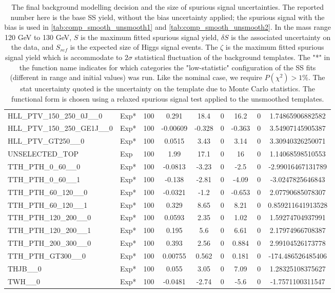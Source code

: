 \begin{table}[!h]
{\begin{tabular}{llccccccS[table-format = 3.2, round-mode = places, round-precision = 2]}
 HLL\_PTV\_150\_250\_0J\_\_0 & Exp* &100&0.291&18.4&0&16.2&0&1.74865906882582\\
 HLL\_PTV\_150\_250\_GE1J\_\_0 & Exp* &100&-0.00609&-0.328&0&-0.363&0&3.54907145905387\\
 HLL\_PTV\_GT250\_\_0 & Exp* &100&0.0515&3.43&0&3.14&0&3.30940326250071\\
 UNSELECTED\_TOP & Exp &100&1.99&17.1&0&16&0&1.14068598510553\\
 TTH\_PTH\_0\_60\_\_0 & Exp* &100&-0.0813&-3.23&0&-2.5&0&-2.99016467131789\\
 TTH\_PTH\_0\_60\_\_1 & Exp* &100&-0.138&-2.81&0&-4.09&0&-3.0247825646843\\
 TTH\_PTH\_60\_120\_\_0 & Exp* &100&-0.0321&-1.2&0&-0.653&0&2.07790685078307\\
 TTH\_PTH\_60\_120\_\_1 & Exp* &100&0.329&8.65&0&8.21&0&0.859211641913528\\
 TTH\_PTH\_120\_200\_\_0 & Exp* &100&0.0593&2.35&0&1.02&0&1.59274704937991\\
 TTH\_PTH\_120\_200\_\_1 & Exp* &100&0.195&5.6&0&6.61&0&2.17974966708387\\
 TTH\_PTH\_200\_300\_\_0 & Exp* &100&0.393&2.56&0&0.884&0&2.99104526173778\\
 TTH\_PTH\_GT300\_\_0 & Exp* &100&0.00755&0.562&0&0.181&0&-174.486526485406\\
 THJB\_\_0 & Exp* &100&0.055&3.05&0&7.09&0&1.28325108375627\\
 TWH\_\_0 & Exp* &100&-0.0481&-2.74&0&-5.6&0&-1.7571100311547\\
       \hline
      \hline
      \end{tabular}
}
      \caption{
The final background modelling decision and the size of spurious signal uncertainties. The reported number here is the base SS yield, without the bias uncertainty applied; the spurious signal with the bias is used in \ref{tab:comp_smooth_unsmooth1} and \ref{tab:comp_smooth_unsmooth2}.
   In the mass range 120 GeV to 130 GeV, $S$ is the maximum fitted spurious signal yield, $\delta S$ is the associated uncertainty on the data, and $S_{ref}$ is the expected size of Higgs signal events.
   The $\zeta$ is the maximum fitted spurious signal yield which is accommodate to $2\sigma$ statistical fluctuation of the background templates.
   The "*" in the function name indicates for which categories the "low-statistic" configuration of the SS fits (different in range and initial values) was run.
   Like the nominal case, we require $P(\chi^2) > 1\%$. The stat uncertainty quoted is the uncertainty on the template due to Monte Carlo statistics. The functional form is chosen using a relaxed spurious signal test applied to the unsmoothed templates. 
   \label{tab:spurious_sig_gp2}   }   
\end{table}

